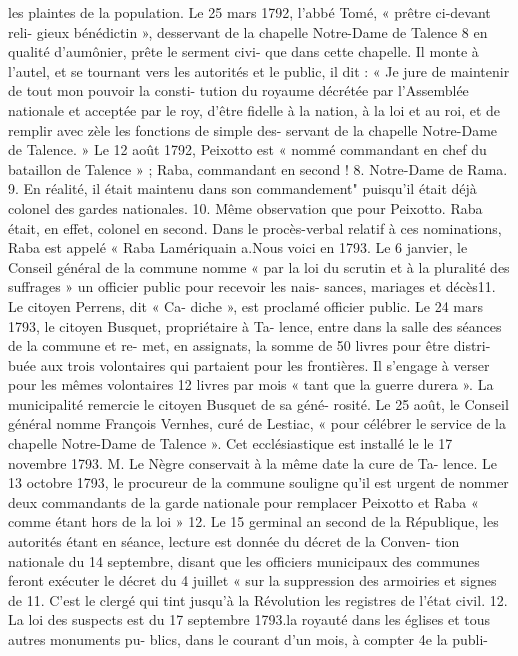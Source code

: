 \documentclass[a4paper,11pt]{book}
\begin{document}
les plaintes de la population.
Le 25 mars 1792, l'abbé Tomé, « prêtre ci-devant reli-
gieux bénédictin », desservant de la chapelle Notre-Dame
de Talence 8 en qualité d'aumônier, prête le serment civi-
que dans cette chapelle. Il monte à l'autel, et se tournant
vers les autorités et le public, il dit :
« Je jure de maintenir de tout mon pouvoir la consti-
tution du royaume décrétée par l'Assemblée nationale et
acceptée par le roy, d'être fidelle à la nation, à la loi et
au roi, et de remplir avec zèle les fonctions de simple des-
servant de la chapelle Notre-Dame de Talence. »
Le 12 août 1792, Peixotto est « nommé commandant en
chef du bataillon de Talence » ; Raba, commandant en
second
!
8. Notre-Dame de Rama.
9. En réalité, il était maintenu dans son commandement" puisqu'il était
déjà colonel des gardes nationales.
10. Même observation que pour Peixotto. Raba était, en effet, colonel
en second.
Dans le procès-verbal relatif à ces nominations, Raba est appelé
« Raba Lamériquain a.Nous voici en 1793. Le 6 janvier, le Conseil général de
la commune nomme « par la loi du scrutin et à la pluralité
des suffrages » un officier public pour recevoir les nais-
sances, mariages et décès11. Le citoyen Perrens, dit « Ca-
diche », est proclamé officier public.
Le 24 mars 1793, le citoyen Busquet, propriétaire à Ta-
lence, entre dans la salle des séances de la commune et re-
met, en assignats, la somme de 50 livres pour être distri-
buée aux trois volontaires qui partaient pour les frontières.
Il s'engage à verser pour les mêmes volontaires 12 livres
par mois « tant que la guerre durera ».
La municipalité remercie le citoyen Busquet de sa géné-
rosité.
Le 25 août, le Conseil général nomme François Vernhes,
curé de Lestiac, « pour célébrer le service de la chapelle
Notre-Dame de Talence ». Cet ecclésiastique est installé le
le 17 novembre 1793.
M. Le Nègre conservait à la même date la cure de Ta-
lence.
Le 13 octobre 1793, le procureur de la commune souligne
qu'il est urgent de nommer deux commandants de la garde
nationale pour remplacer Peixotto et Raba « comme étant
hors de la loi » 12.
Le 15 germinal an second de la République, les autorités
étant en séance, lecture est donnée du décret de la Conven-
tion nationale du 14 septembre, disant que les officiers
municipaux des communes feront exécuter le décret du
4 juillet « sur la suppression des armoiries et signes de
11. C'est le clergé qui tint jusqu'à la Révolution les registres de l'état
civil.
12. La loi des suspects est du 17 septembre 1793.la royauté dans les églises et tous autres monuments
pu-
blics, dans le courant d'un mois, à compter 4e la publi-
\end{document}
